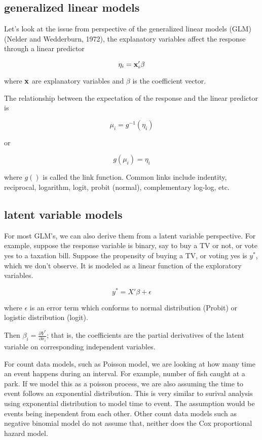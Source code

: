 \subsection{generalized linear models}

Let's look at the issue from perspective of the generalized linear
models (GLM) (Nelder and Wedderburn, 1972), the explanatory variables
affect the response through a linear predictor

\[\eta_i={\bf x}_i' \beta \]

where $\bf x$ are explanatory variables and $\beta$ is the coefficient
vector.  

The relationship between the expectation of the response and the
linear predictor is 

\[\mu_i=g^{-1} (\eta_i) \]

or

\[g(\mu_i)=\eta_i \]

where $g()$ is called the link function.  Common links include
indentity, reciprocal, logarithm, logit, probit (normal),
complementary log-log, etc.  


\subsection{latent variable models}

For most GLM's, we can also derive them from a latent variable
perspective.  For example, suppose the response variable is binary,
say to buy a TV or not, or vote yes to a taxation bill.  Suppose the
propensity of buying a TV, or voting yes is $y^*$,
which we don't observe.  It is modeled as a linear function of the exploratory
variables.  

\[y^*= X'\beta + \epsilon\]

where $\epsilon$ is an error term which conforms to normal
distribution (Probit) or logistic distribution (logit).  

Then $\beta_i=\frac{\partial Y^* }{\partial x_i}$; that is, the
coefficients are the partial derivatives of the latent variable on
corresponding independent variables.  


For count data models, such as Poisson model, we are looking at how
many time an event happens during an interval.  For example, number of
fish caught at a park.  If we model this as a poisson process, we are
also assuming the time to event follows an exponential distribution.
This is very similar to surival analysis using exponential
distribution to model time to event.  The assumption would be events
being inependent from each other.  Other count data models such as
negative binomial model do not assume that, neither does the Cox
proportional hazard model.


